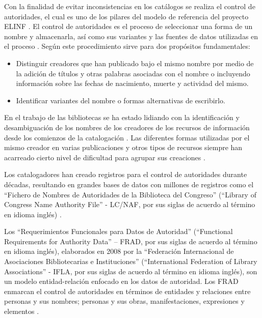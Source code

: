 Con la finalidad de evitar inconsistencias en los catálogos se realiza el control de autoridades, el cual es uno de los pilares del modelo de referencia del proyecto ELINF \citep{Ciudad-Ricardo2017}. El control de autoridades es el proceso de seleccionar una forma de un nombre y almacenarla, así como sus variantes y las fuentes de datos utilizadas en el proceso \citep{Sandberg2016}. Según \cite{Carrasco2016} este procedimiento sirve para dos propósitos fundamentales:

\begin{itemize}
\item Distinguir creadores que han publicado bajo el mismo nombre por medio de la adición de títulos y otras palabras asociadas con el nombre o incluyendo información sobre las fechas de nacimiento, muerte y actividad del mismo.
\item Identificar variantes del nombre o formas alternativas de escribirlo.
\end{itemize}

En el trabajo de las bibliotecas se ha estado lidiando con la identificación y desambiguación de los nombres de los creadores de los recursos de información desde los comienzos de la catalogación \citep{Harper2007}. Las diferentes formas utilizadas por el mismo creador en varias publicaciones y otros tipos de recursos siempre han acarreado cierto nivel de dificultad para agrupar sus creaciones \citep{Harper2007}.

Los catalogadores han creado registros para el control de autoridades durante décadas, resultando en grandes bases de datos con millones de registros como el ``Fichero de Nombres de Autoridades de la Biblioteca del Congreso'' (``Library of Congress Name Authority File'' - LC/NAF, por sus siglas de acuerdo al término en idioma inglés) \citep{Sandberg2016}.

Los ``Requerimientos Funcionales para Datos de Autoridad'' (``Functional Requirements for Authority Data'' – FRAD, por sus siglas de acuerdo al término en idioma inglés), elaborados en 2008 por la ``Federación Internacional de Asociaciones Bibliotecarias e Instituciones'' (``International Federation of Library Associations'' - IFLA, por sus siglas de acuerdo al término en idioma inglés), son un modelo entidad-relación enfocado en los datos de autoridad. Los FRAD enmarcan el control de autoridades en términos de entidades y relaciones entre personas y sus nombres; personas y sus obras, manifestaciones, expresiones y elementos \citep{InternationalFederationofLibraryAssociationsandInstitutions2009,Sandberg2016}.

